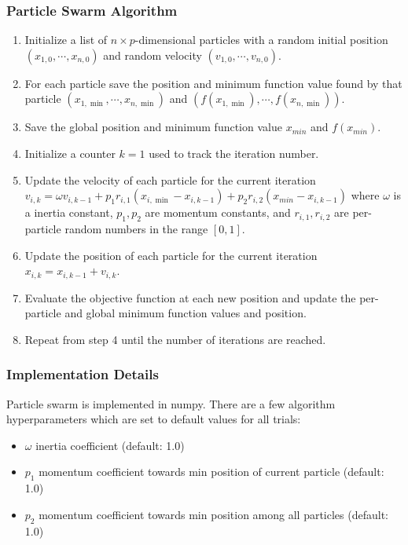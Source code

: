 \documentclass{vgtc}                          %
\begin{document}
\subsubsection{Particle Swarm Algorithm}

\begin{enumerate}
\item Initialize a list of $n \times p$-dimensional particles with a random initial position $(x_{1,0}, \cdots, x_{n,0})$ and random velocity $(v_{1,0}, \cdots, v_{n,0})$.
\item For each particle save the position and minimum function value found by that particle $(x_{1,\min}, \cdots, x_{n,\min})$ and $(f(x_{1,\min}), \cdots, f(x_{n,\min}))$.
\item Save the global position and minimum function value $x_{min}$ and $f(x_{min})$.
\item Initialize a counter $k=1$ used to track the iteration number.
\item Update the velocity of each particle for the current iteration $v_{i,k} = \omega v_{i,k-1} + p_1 r_{i,1} (x_{i,\min} - x_{i,k-1}) + p_2 r_{i,2} (x_{min} - x_{i,k-1})$ where $\omega$ is a inertia constant, $p_1, p_2$ are momentum constants, and $r_{i,1}, r_{i,2}$ are per-particle random numbers in the range $[0,1]$.
\item Update the position of each particle for the current iteration $x_{i,k} = x_{i,k-1} + v_{i,k}$.
\item Evaluate the objective function at each new position and update the per-particle and global minimum function values and position.
\item Repeat from step 4 until the number of iterations are reached.
\end{enumerate}

\subsubsection{Implementation Details}

Particle swarm is implemented in numpy. There are a few algorithm hyperparameters which are set to default values for all trials:
\begin{itemize}
\item $\omega$ inertia coefficient (default: 1.0)
\item $p_1$ momentum coefficient towards min position of current particle (default: 1.0)
\item $p_2$ momentum coefficient towards min position among all particles (default: 1.0)
\end{itemize}
\end{document}
